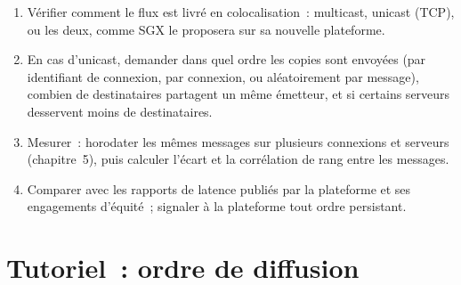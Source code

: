 \begin{method}\label{met:nw:the-asia-pacific-map:audit}
\begin{enumerate}
\item Vérifier comment le flux est livré en colocalisation~: multicast, unicast (TCP), ou les deux, comme SGX le proposera sur sa nouvelle plateforme.
\item En cas d'unicast, demander dans quel ordre les copies sont envoyées (par identifiant de connexion, par connexion, ou aléatoirement par message), combien de destinataires partagent un même émetteur,
  et si certains serveurs desservent moins de destinataires.
\item Mesurer~: horodater les mêmes messages sur plusieurs connexions et serveurs (chapitre~5), puis calculer l'écart et la corrélation de rang entre
  les messages.
\item Comparer avec les rapports de latence publiés par la plateforme et ses engagements d'équité~; signaler à la plateforme tout ordre persistant.
\end{enumerate}
\end{method}

\section{Tutoriel~: ordre de diffusion}\label{tut:nw:the-asia-pacific-map:tut}

